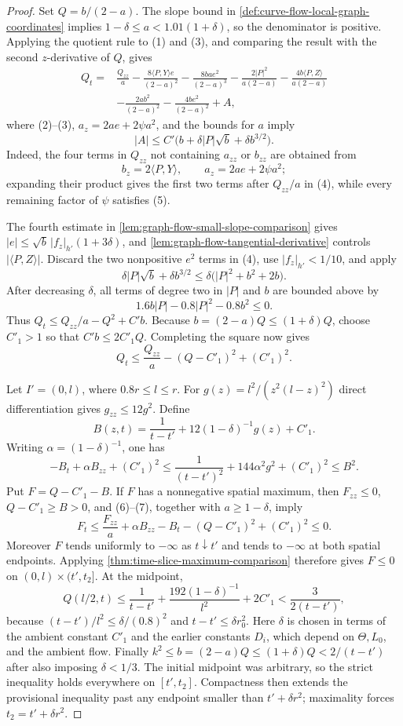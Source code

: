 \begin{proof}
Set $Q=b/(2-a)$.  The slope bound in
\ref{def:curve-flow-local-graph-coordinates} implies
$1-\delta\le a<1.01(1+\delta)$, so the denominator is positive.  Applying
the quotient rule to (1) and (3), and comparing the result with the second
$z$-derivative of $Q$, gives
\begin{align*}
 Q_t={}&\frac{Q_{zz}}a
 -\frac{8\langle P,Y\rangle e}{(2-a)^2}
 -\frac{8ba e^2}{(2-a)^3}
 -\frac{2|P|^2}{a(2-a)}
 -\frac{4b\langle P,Z\rangle}{a(2-a)}\\
 &-\frac{2ab^2}{(2-a)^2}
 -\frac{4be^2}{(2-a)^2}+A,                          \tag{4}
\end{align*}
where (2)--(3), $a_z=2ae+2\psi a^2$, and the bounds for $a$ imply
\[
 |A|\le C'\bigl(b+\delta |P|\sqrt b+\delta b^{3/2}\bigr).       \tag{5}
\]
Indeed, the four terms in $Q_{zz}$ not containing $a_{zz}$ or $b_{zz}$
are obtained from
\[
 b_z=2\langle P,Y\rangle,
 \qquad a_z=2ae+2\psi a^2;
\]
expanding their product gives the first two terms after $Q_{zz}/a$ in
(4), while every remaining factor of $\psi$ satisfies (5).

The fourth estimate in \ref{lem:graph-flow-small-slope-comparison} gives
$|e|\le\sqrt b\,|f_z|_{h'}(1+3\delta)$, and
\ref{lem:graph-flow-tangential-derivative} controls
$|\langle P,Z\rangle|$.  Discard the two nonpositive $e^2$ terms in
(4), use $|f_z|_{h'}<1/10$, and apply
\[
 \delta |P|\sqrt b+\delta b^{3/2}
 \le \delta\bigl(|P|^2+b^2+2b\bigr).
\]
After decreasing $\delta$, all terms of degree two in $|P|$ and $b$ are
bounded above by
\[
 1.6b|P|-0.8|P|^2-0.8b^2\le0.
\]
Thus $Q_t\le Q_{zz}/a-Q^2+C'b$.  Because
$b=(2-a)Q\le(1+\delta)Q$, choose $C'_1>1$ so that
$C'b\le2C'_1Q$.  Completing the square now gives
\[
 Q_t\le\frac{Q_{zz}}a-(Q-C'_1)^2+(C'_1)^2.                     \tag{6}
\]

Let $I'=(0,l)$, where $0.8r\le l\le r$.  For
$g(z)=l^2/(z^2(l-z)^2)$ direct differentiation gives
$g_{zz}\le12g^2$.  Define
\[
 B(z,t)=\frac1{t-t'}+12(1-\delta)^{-1}g(z)+C'_1.
\]
Writing $\alpha=(1-\delta)^{-1}$, one has
\[
 -B_t+\alpha B_{zz}+(C'_1)^2
 \le\frac1{(t-t')^2}+144\alpha^2g^2+(C'_1)^2\le B^2.             \tag{7}
\]
Put $F=Q-C'_1-B$.  If $F$ has a nonnegative spatial maximum, then
$F_{zz}\le0$, $Q-C'_1\ge B>0$, and (6)--(7), together with
$a\ge1-\delta$, imply
\[
 F_t\le\frac{F_{zz}}a+\alpha B_{zz}-B_t
       -(Q-C'_1)^2+(C'_1)^2\le0.
\]
Moreover $F$ tends uniformly to $-\infty$ as $t\downarrow t'$ and tends
to $-\infty$ at both spatial endpoints.  Applying
\ref{thm:time-slice-maximum-comparison} therefore gives
$F\le0$ on $(0,l)\times(t',t_2]$.
At the midpoint,
\[
 Q(l/2,t)\le\frac1{t-t'}+
 \frac{192(1-\delta)^{-1}}{l^2}+2C'_1
 <\frac{3}{2(t-t')},
\]
because $(t-t')/l^2\le\delta/(0.8)^2$ and
$t-t'\le\delta r_0^2$.  Here $\delta$ is chosen in terms of the ambient
constant $C'_1$ and the earlier constants $D_i$, which depend on
$\Theta,L_0$, and the ambient flow.  Finally
$k^2\le b=(2-a)Q\le(1+\delta)Q<2/(t-t')$ after also imposing
$\delta<1/3$.  The initial midpoint was arbitrary, so the strict inequality
holds everywhere on $[t',t_2]$.  Compactness then extends the provisional
inequality past any endpoint smaller than $t'+\delta r^2$; maximality forces
$t_2=t'+\delta r^2$.
\end{proof}


